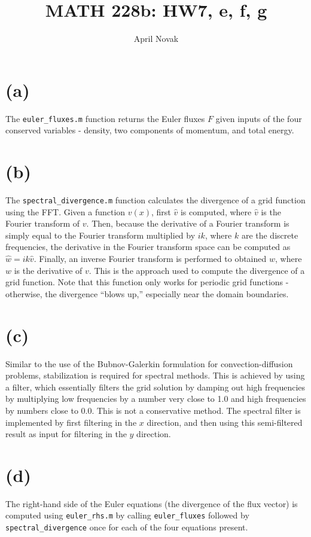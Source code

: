\documentclass[10pt]{article}
\begin{document}
\title{MATH 228b: HW7, e, f, g}
\author{April Novak}

\maketitle

\section{(a)}
The {\tt euler\_fluxes.m} function returns the Euler fluxes \(F\) given inputs of the four conserved variables - density, two components of momentum, and total energy.

\section{(b)}
The {\tt spectral\_divergence.m} function calculates the divergence of a grid function using the FFT. Given a function \(v(x)\), first \(\hat{v}\) is computed, where \(\hat{v}\) is the Fourier transform of \(v\). Then, because the derivative of a Fourier transform is simply equal to the Fourier transform multiplied by \(ik\), where \(k\) are the discrete frequencies, the derivative in the Fourier transform space can be computed as \(\hat{w}=ik\hat{v}\). Finally, an inverse Fourier transform is performed to obtained \(w\), where \(w\) is the derivative of \(v\). This is the approach used to compute the divergence of a grid function. Note that this function only works for periodic grid functions - otherwise, the divergence ``blows up,'' especially near the domain boundaries.

\section{(c)}
Similar to the use of the Bubnov-Galerkin formulation for convection-diffusion problems, stabilization is required for spectral methods. This is achieved by using a filter, which essentially filters the grid solution by damping out high frequencies by multiplying low frequencies by a number very close to 1.0 and high frequencies by numbers close to 0.0. This is not a conservative method. The spectral filter is implemented by first filtering in the \(x\) direction, and then using this semi-filtered result as input for filtering in the \(y\) direction.

\section{(d)}
The right-hand side of the Euler equations (the divergence of the flux vector) is computed using {\tt euler\_rhs.m} by calling {\tt euler\_fluxes} followed by {\tt spectral\_divergence} once for each of the four equations present.
\end{document}
